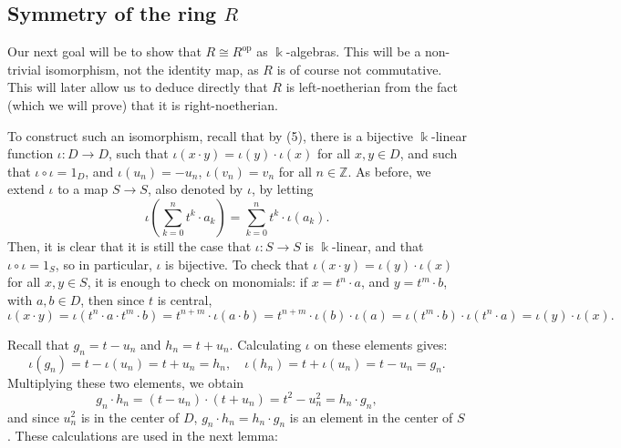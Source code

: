 \documentclass{amsart}
\theoremstyle{definition}
\newcommand{\opn}{\operatorname}
\renewcommand{\k}{\Bbbk}
\numberwithin{equation}{section}
\begin{document}
\subsection{Symmetry of the ring $R$}\label{sec:symm}

Our next goal will be to show that $R \cong R^{\opn{op}}$ as $\k$-algebras. This will be a non-trivial isomorphism, not the identity map, as $R$ is of course not commutative. This will later allow us to deduce directly that $R$ is left-noetherian from the fact (which we will prove) that it is right-noetherian.

To construct such an isomorphism,
recall that by (5),
there is a bijective $\k$-linear function $\iota:D \to D$,
such that $\iota(x\cdot y) = \iota(y)\cdot \iota(x)$ for all $x,y \in D$,
and such that $\iota\circ \iota = 1_D$, and $\iota(u_n) = -u_n$, $\iota(v_n) = v_n$ for all $n \in \mathbb{Z}$.
As before, we extend $\iota$ to a map $S\to S$, also denoted by $\iota$,
by letting
\begin{equation}\label{eqn:iotaExtended}
\iota\left(\sum_{k=0}^n t^k \cdot a_k\right) = \sum_{k=0}^n t^k \cdot \iota(a_k).
\end{equation}
Then, it is clear that it is still the case that $\iota:S \to S$ is $\k$-linear, and that $\iota\circ \iota = 1_S$, so in particular, $\iota$ is bijective.
To check that $\iota(x\cdot y) = \iota(y)\cdot \iota(x)$ for all $x,y \in S$, it is enough to check on monomials:
if $x = t^n \cdot a$, and $y = t^m\cdot b$, with $a,b \in D$,
then since $t$ is central,
\[
\iota(x\cdot y) = \iota(t^n\cdot a \cdot t^m \cdot b) = 
t^{n+m} \cdot \iota(a\cdot b) = t^{n+m} \cdot \iota(b)\cdot \iota(a) = 
\iota(t^m\cdot b) \cdot \iota(t^n \cdot a) = \iota(y) \cdot \iota(x).
\]

Recall that $g_n = t-u_n$ and $h_n = t+u_n$.
Calculating $\iota$ on these elements gives:
\begin{equation}\label{eqn:iotagh}
\iota(g_n) = t-\iota(u_n) = t+u_n = h_n,
\quad \iota(h_n) = t+\iota(u_n) = t-u_n = g_n.
\end{equation}
Multiplying these two elements, we obtain
\begin{equation}\label{eqn:gnhn}
g_n \cdot h_n = (t-u_n)\cdot (t+u_n) = t^2-u_n^2 = h_n\cdot g_n,
\end{equation}
and since $u_n^2$ is in the center of $D$, 
$g_n\cdot h_n = h_n\cdot g_n$ is an element in the center of $S$.
These calculations are used in the next lemma:
\end{document}
